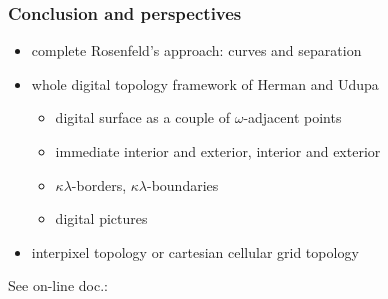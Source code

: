 \documentclass[pdftex,francais]{beamer}
\begin{document}
\begin{frame}
  \frametitle{Conclusion and perspectives}
  
  \begin{itemize}
  \item complete Rosenfeld's approach: curves and separation
  \item whole digital topology framework of Herman and Udupa
    \begin{itemize}
    \item digital surface as a couple of $\omega$-adjacent points
    \item immediate interior and exterior, interior and exterior
    \item $\kappa \lambda$-borders, $\kappa \lambda$-boundaries
    \item digital pictures
    \end{itemize}
  \item interpixel topology or cartesian cellular grid topology 
  \end{itemize}
  See on-line doc.: 

\end{frame}
\end{document}
